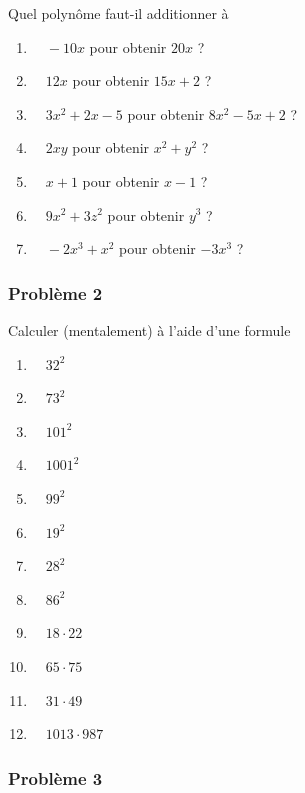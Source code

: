 \documentclass[
  12pt,
]{book}
\providecommand{\tightlist}{%
  \setlength{\itemsep}{0pt}\setlength{\parskip}{0pt}}
\begin{document}
Quel polynôme faut-il additionner à

\begin{enumerate}
\def\labelenumi{\arabic{enumi}.}
\tightlist
\item
  \(\quad -10x\) pour obtenir \(20x\) ?
\item
  \(\quad 12x\) pour obtenir \(15x+2\) ?
\item
  \(\quad 3x^2+2x-5\) pour obtenir \(8x^2-5x+2\) ?
\item
  \(\quad 2xy\) pour obtenir \(x^2+y^2\) ?
\item
  \(\quad x+1\) pour obtenir \(x-1\) ?
\item
  \(\quad 9x^2+3z^2\) pour obtenir \(y^3\) ?
\item
  \(\quad -2x^3+x^2\) pour obtenir \(-3x^3\) ?
\end{enumerate}

\hypertarget{probluxe8me-2-2}{%
\subsubsection*{Problème 2}\label{probluxe8me-2-2}}

Calculer (mentalement) à l'aide d'une formule

\begin{enumerate}
\def\labelenumi{\arabic{enumi}.}
\tightlist
\item
  \(\quad 32^2\)
\item
  \(\quad 73^2\)
\item
  \(\quad 101^2\)
\item
  \(\quad 1001^2\)
\item
  \(\quad 99^2\)
\item
  \(\quad 19^2\)
\item
  \(\quad 28^2\)
\item
  \(\quad 86^2\)
\item
  \(\quad 18\cdot 22\)
\item
  \(\quad 65\cdot 75\)
\item
  \(\quad 31\cdot 49\)
\item
  \(\quad 1013\cdot 987\)
\end{enumerate}

\hypertarget{probluxe8me-3-2}{%
\subsubsection*{Problème 3}\label{probluxe8me-3-2}}
\end{document}
